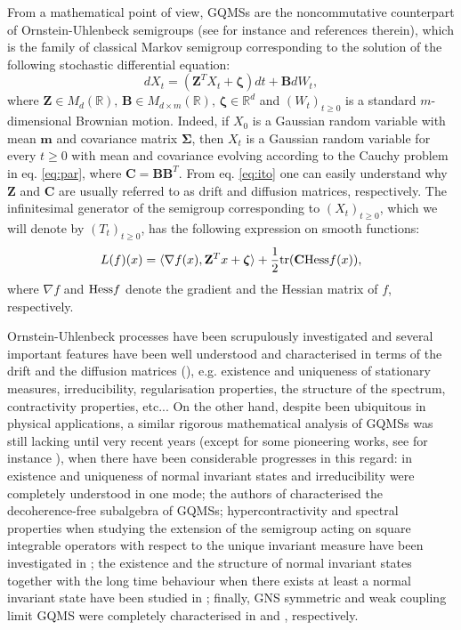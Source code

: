 \documentclass[preprint]{elsarticle}
\theoremstyle{definition}
\def\RR{\mathbb{R}}
\def\tr{{\rm tr}}
\begin{document}
From a mathematical point of view, GQMSs are the noncommutative counterpart of Ornstein-Uhlenbeck semigroups (see for instance \cite{LMP20,FPSU24} and references therein), which is the family of classical Markov semigroup corresponding to the solution of the following stochastic differential equation:
\begin{equation} \label{eq:ito} dX_t=(\mathbf{Z}^TX_t+\boldsymbol{\zeta})dt + \mathbf{B}dW_t,\end{equation}
where $\mathbf{Z} \in M_d(\RR), \, \mathbf{B} \in M_{d\times m}(\RR), \, \boldsymbol{\zeta} \in \RR^d$ and $(W_t)_{t \geq 0}$ is a standard $m$-dimensional Brownian motion. Indeed, if $X_0$ is a Gaussian random variable with mean $\mathbf{m}$ and covariance matrix $\boldsymbol{\Sigma}$, then $X_t$ is a Gaussian random variable for every $t \geq 0$ with mean and covariance evolving according to the Cauchy problem in eq. \eqref{eq:par}, where $\mathbf{C}=\mathbf{B}\mathbf{B}^T.$ From eq. \eqref{eq:ito} one can easily understand why $\mathbf{Z}$ and $\mathbf{C}$ are usually referred to as drift and diffusion matrices, respectively. The infinitesimal generator of the semigroup corresponding to $(X_t)_{t \geq 0}$, which we will denote by $(T_t)_{t \geq 0}$, has the following expression on smooth functions:
\begin{equation}\label{eq:OUfp}
L(f)(x)=\langle \nabla f(x),\mathbf{Z}^Tx+\boldsymbol{\zeta}  \rangle+\frac{1}{2}\tr(\mathbf{C}{\rm Hess}f(x)),\end{equation}
where $\nabla f$ and ${\rm Hess} f$ denote the gradient and the Hessian matrix of $f$, respectively.

\bigskip Ornstein-Uhlenbeck processes have been scrupulously investigated and several important features have been well understood and characterised in terms of the drift and the diffusion matrices (\cite{LMP20}), e.g. existence and uniqueness of stationary measures, irreducibility, regularisation properties, the structure of the spectrum, contractivity properties, etc... On the other hand, despite been ubiquitous in physical applications, a similar rigorous mathematical analysis of GQMSs was still lacking until very recent years (except for some pioneering works, see for instance \cite{CFL00,KP04,CS08}), when there have been considerable progresses in this regard: in \cite{AFP21} existence and uniqueness of normal invariant states and irreducibility were completely understood in one mode; the authors of \cite{AFP22} characterised the decoherence-free subalgebra of GQMSs; hypercontractivity and spectral properties when studying the extension of the semigroup acting on square integrable operators with respect to the unique invariant measure have been investigated in \cite{FPSU24,FL25,Li25,SXZ26}; the existence and the structure of normal invariant states together with the long time behaviour when there exists at least a normal invariant state have been studied in \cite{GP26}; finally, GNS symmetric and weak coupling limit GQMS were completely characterised in \cite{BSFQ26} and \cite{PSU26}, respectively. 
\end{document}
